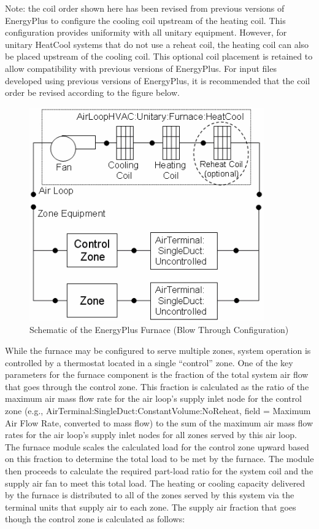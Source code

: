 Note: the coil order shown here has been revised from previous versions of EnergyPlus to configure the cooling coil upstream of the heating coil. This configuration provides uniformity with all unitary equipment. However, for unitary HeatCool systems that do not use a reheat coil, the heating coil can also be placed upstream of the cooling coil. This optional coil placement is retained to allow compatibility with previous versions of EnergyPlus. For input files developed using previous versions of EnergyPlus, it is recommended that the coil order be revised according to the figure below.

\begin{figure}[hbtp] %
\centering
\includegraphics[width=0.9\textwidth, height=0.9\textheight, keepaspectratio=true]{media/image5019.png}
\caption{Schematic of the EnergyPlus Furnace (Blow Through Configuration) \protect \label{fig:schematic-of-the-energyplus-furnace-blow}}
\end{figure}

While the furnace may be configured to serve multiple zones, system operation is controlled by a thermostat located in a single ``control'' zone. One of the key parameters for the furnace component is the fraction of the total system air flow that goes through the control zone. This fraction is calculated as the ratio of the maximum air mass flow rate for the air loop's supply inlet node for the control zone (e.g., AirTerminal:SingleDuct:ConstantVolume:NoReheat, field = Maximum Air Flow Rate, converted to mass flow) to the sum of the maximum air mass flow rates for the air loop's supply inlet nodes for all zones served by this air loop. The furnace module scales the calculated load for the control zone upward based on this fraction to determine the total load to be met by the furnace. The module then proceeds to calculate the required part-load ratio for the system coil and the supply air fan to meet this total load. The heating or cooling capacity delivered by the furnace is distributed to all of the zones served by this system via the terminal units that supply air to each zone. The supply air fraction that goes though the control zone is calculated as follows:

